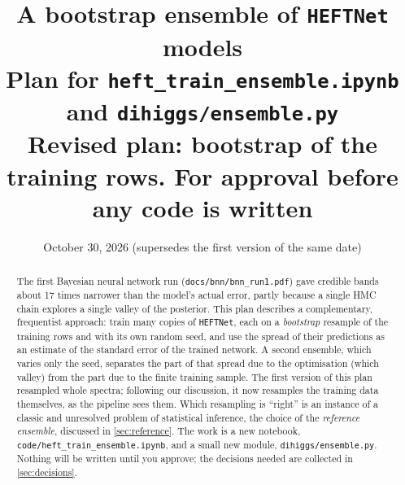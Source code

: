 \documentclass[11pt]{article}
\title{\textbf{A bootstrap ensemble of \texttt{HEFTNet} models}\\[4pt]
\large Plan for \texttt{heft\_train\_ensemble.ipynb} and \texttt{dihiggs/ensemble.py}\\[4pt]
\normalsize Revised plan: bootstrap of the training rows. For approval before any code is written}
\date{October 30, 2026 (supersedes the first version of the same date)}
\newcommand{\file}[1]{\nolinkurl{#1}}
\newcommand{\code}[1]{\texttt{#1}}
\begin{document}
\maketitle

\begin{abstract}
\noindent
The first Bayesian neural network run (\file{docs/bnn/bnn_run1.pdf}) gave credible
bands about 17 times narrower than the model's actual error, partly because a single
HMC chain explores a single valley of the posterior. This plan describes a
complementary, frequentist approach: train many copies of \code{HEFTNet}, each on a
\emph{bootstrap} resample of the training rows and with its own random seed, and use the
spread of their predictions as an estimate of the standard error of the trained network.
A second ensemble, which varies only the seed, separates the part of that spread due to
the optimisation (which valley) from the part due to the finite training sample. The
first version of this plan resampled whole spectra; following our discussion, it now
resamples the training data themselves, as the pipeline sees them. Which resampling is
``right'' is an instance of a classic and unresolved problem of statistical inference,
the choice of the \emph{reference ensemble}, discussed in \cref{sec:reference}. The work
is a new notebook, \file{code/heft_train_ensemble.ipynb}, and a small new module,
\file{dihiggs/ensemble.py}. Nothing will be written until you approve; the decisions
needed are collected in \cref{sec:decisions}.
\end{abstract}
\end{document}
